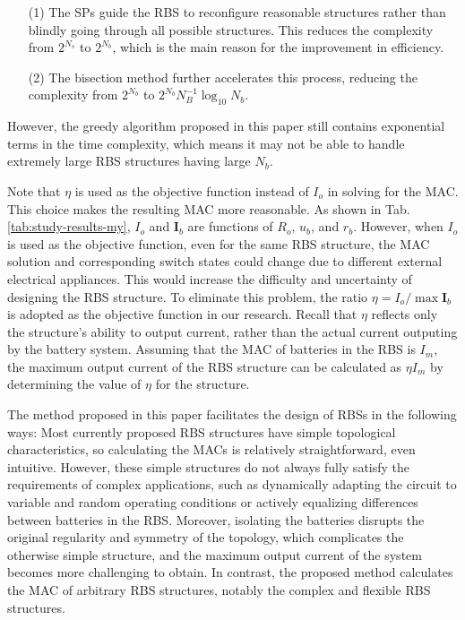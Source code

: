 \documentclass{article}
\begin{document}
\begin{enumerate}
\item[(1)] The SPs guide the RBS to reconfigure reasonable structures rather than blindly going through all possible structures. This reduces the complexity from $2^{N_s}$ to $2^{N_b}$, which is the main reason for the improvement in efficiency.
\item[(2)] The bisection method further accelerates this process, reducing the complexity from $2^{N_b}$ to $2^{N_b} N_B^{-1} \log_{10} N_b$.
\end{enumerate}
However, the greedy algorithm proposed in this paper still contains exponential terms in the time complexity, which means it may not be able to handle extremely large RBS structures having large $N_b$.



Note that $\eta$ is used as the objective function instead of $I_o$ in solving for the MAC. 
This choice makes the resulting MAC more reasonable. 
As shown in Tab. \ref{tab:study-results-my}, $I_o$ and $\bm{I}_b$ are functions of $R_o$, $u_b$, and $r_b$. 
However, when $I_o$ is used as the objective function, even for the same RBS structure, the MAC solution and corresponding switch states could change due to different external electrical appliances.
This would increase the difficulty and uncertainty of designing the RBS structure. 
To eliminate this problem, the ratio $\eta=I_o/\max\bm{I}_b$ is adopted as the objective function in our research.
Recall that $\eta$ reflects only the structure's ability to output current, rather than the actual current outputing by the battery system.
Assuming that the MAC of batteries in the RBS is $I_m$, the maximum output current of the RBS structure can be calculated as $\eta I_m$ by determining the value of $\eta$ for the structure. 


The method proposed in this paper facilitates the design of RBSs in the following ways:
Most currently proposed RBS structures \cite{ciNovelDesignAdaptive2007,alahmadBatterySwitchArray2008,kimDependableEfficientScalable2010b,kimBalancedReconfigurationStorage2011a,taesickimSeriesconnectedSelfreconfigurableMulticell2012a,6843711} have simple topological characteristics, so calculating the MACs is relatively straightforward, even intuitive.
However, these simple structures do not always fully satisfy the requirements of complex applications, such as dynamically adapting the circuit to variable and random operating conditions or actively equalizing differences between batteries in the RBS.
Moreover, isolating the batteries disrupts the original regularity and symmetry of the topology, which complicates the otherwise simple structure, and the maximum output current of the system becomes more challenging to obtain.
In contrast, the proposed method calculates the MAC of arbitrary RBS structures, notably the complex and flexible RBS structures.
\end{document}
